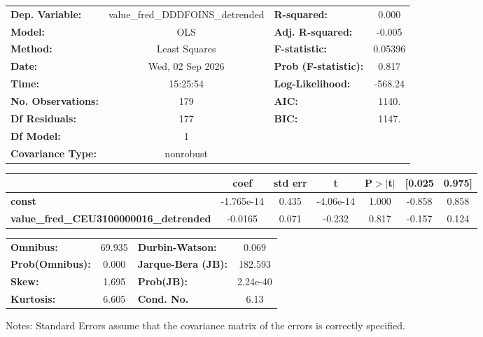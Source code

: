 \begin{center}
\begin{tabular}{lclc}
\toprule
\textbf{Dep. Variable:}                        & value\_fred\_DDDFOINS\_detrended & \textbf{  R-squared:         } &     0.000   \\
\textbf{Model:}                                &               OLS                & \textbf{  Adj. R-squared:    } &    -0.005   \\
\textbf{Method:}                               &          Least Squares           & \textbf{  F-statistic:       } &   0.05396   \\
\textbf{Date:}                                 &         Wed, 02 Sep 2026         & \textbf{  Prob (F-statistic):} &    0.817    \\
\textbf{Time:}                                 &             15:25:54             & \textbf{  Log-Likelihood:    } &   -568.24   \\
\textbf{No. Observations:}                     &                 179              & \textbf{  AIC:               } &     1140.   \\
\textbf{Df Residuals:}                         &                 177              & \textbf{  BIC:               } &     1147.   \\
\textbf{Df Model:}                             &                   1              & \textbf{                     } &             \\
\textbf{Covariance Type:}                      &            nonrobust             & \textbf{                     } &             \\
\bottomrule
\end{tabular}
\begin{tabular}{lcccccc}
                                               & \textbf{coef} & \textbf{std err} & \textbf{t} & \textbf{P$> |$t$|$} & \textbf{[0.025} & \textbf{0.975]}  \\
\midrule
\textbf{const}                                 &   -1.765e-14  &        0.435     & -4.06e-14  &         1.000        &       -0.858    &        0.858     \\
\textbf{value\_fred\_CEU3100000016\_detrended} &      -0.0165  &        0.071     &    -0.232  &         0.817        &       -0.157    &        0.124     \\
\bottomrule
\end{tabular}
\begin{tabular}{lclc}
\textbf{Omnibus:}       & 69.935 & \textbf{  Durbin-Watson:     } &    0.069  \\
\textbf{Prob(Omnibus):} &  0.000 & \textbf{  Jarque-Bera (JB):  } &  182.593  \\
\textbf{Skew:}          &  1.695 & \textbf{  Prob(JB):          } & 2.24e-40  \\
\textbf{Kurtosis:}      &  6.605 & \textbf{  Cond. No.          } &     6.13  \\
\bottomrule
\end{tabular}
\end{center}

Notes: \newline
 [1] Standard Errors assume that the covariance matrix of the errors is correctly specified.